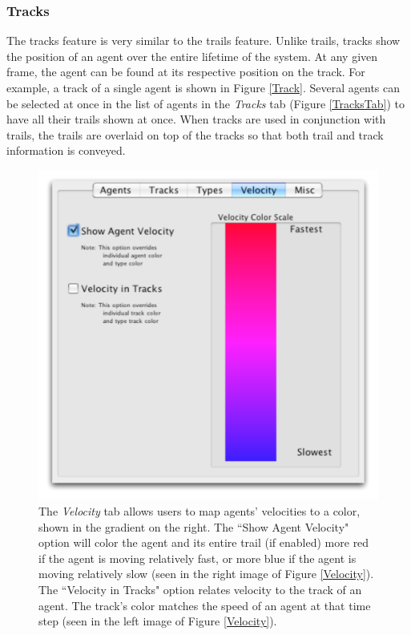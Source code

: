 \documentclass[conference]{IEEEtran}
\begin{document}
\subsubsection{Tracks}

The tracks feature is very similar to the trails feature. Unlike trails, tracks show the position of an agent over the entire
lifetime of the system. At any given frame, the agent can be found at its respective position on the track.
For example, a track of a single agent is shown in Figure \ref{Track}.
Several agents can be selected at once in the list of agents in the \textit{Tracks} tab (Figure \ref{TracksTab}) to
have all their trails shown at once.
When tracks are used in conjunction with trails, the trails are overlaid on top of the tracks so that
both trail and track information is conveyed.





\begin{figure}
\centering
\includegraphics[scale=.5]{images/velocitytab.pdf}
\caption{
The \textit{Velocity} tab allows users to map agents' velocities to a color, shown in the gradient on the right. The ``Show Agent Velocity"
option will color the agent and its entire trail (if enabled) more red if the agent is moving relatively fast, or more blue if the agent
is moving relatively slow (seen in the right image of Figure \ref{Velocity}).
The ``Velocity in Tracks" option relates velocity to the track of an agent. The track's color matches the speed of an agent at that time step (seen in the left
image of Figure \ref{Velocity}).}
\label{VelocityTab}
\end{figure}
\end{document}
